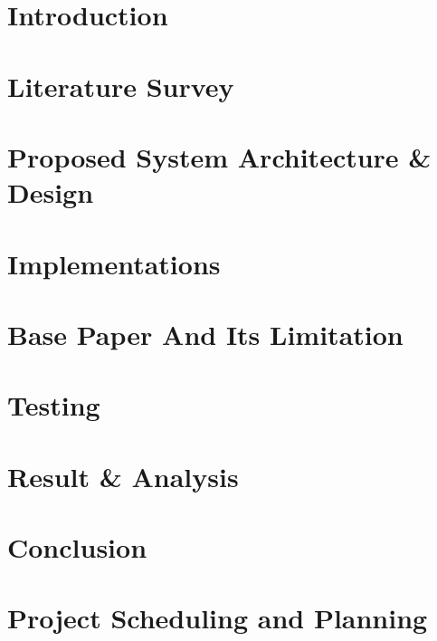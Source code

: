 \documentclass[12pt]{report}
\begin{document}
\tableofcontents

\listoffigures
\listoftables
\newpage

\chapter{Introduction}


\chapter{Literature Survey}
 

\chapter{Proposed System Architecture \& Design}
 

\chapter{Implementations }


\chapter{Base Paper And Its Limitation}


\chapter{Testing}


\chapter{Result \&  Analysis}


\chapter*{Conclusion}


 \chapter*{Project Scheduling and Planning}
 

\printbibliography
\end{document}
